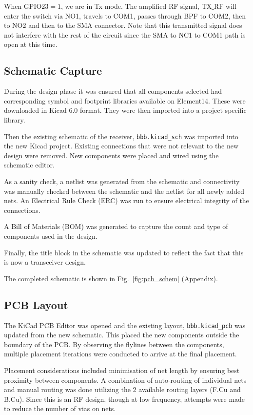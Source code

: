 \documentclass[conference]{IEEEtran}
\begin{document}
When $\text{GPIO23} = 1$, we are in Tx mode. The amplified RF signal, $\text{TX\_RF}$ will enter 
the switch via NO1, travels to COM1, passes through BPF to COM2, then to NO2 and then to the 
SMA connector. Note that this transmitted signal does not interfere with the rest of the circuit 
since the SMA to NC1 to COM1 path is open at this time.

\subsection{Schematic Capture}
During the design phase it was ensured that all components selected had corresponding 
symbol and footprint libraries available on Element14. These were downloaded in 
Kicad 6.0 format. They were then imported into a project specific library. 

Then the existing schematic of the receiver, \texttt{bbb.kicad\_sch} was imported into the new 
Kicad project. Existing connections that were not relevant to the new design were removed. 
New components were placed and wired using the schematic editor. 

As a sanity check, a netlist was generated from the schematic and connectivity was 
manually checked between the schematic and the netlist for all newly added nets. 
An Electrical Rule Check (ERC) was run to ensure electrical integrity of the connections.

A Bill of Materials (BOM) was generated to capture the count and type of components used
in the design. 

Finally, the title block in the schematic was updated to reflect the fact that this is 
now a transceiver design.

The completed schematic is shown in Fig.~\ref{fig:pcb_schem} (Appendix).

\subsection{PCB Layout}
The KiCad PCB Editor was opened and the existing layout, \texttt{bbb.kicad\_pcb} was
updated from the new schematic. This placed the new components outside the boundary
of the PCB. By observing the flylines between the components, multiple placement
iterations were conducted to arrive at the final placement.

Placement considerations included minimisation of net length by ensuring best proximity
between components. A combination of auto-routing of individual nets and manual
routing was done utilizing the 2 available routing layers (F.Cu and B.Cu).
Since this is an RF design, though at low frequency, attempts were made to reduce
the number of vias on nets.
\end{document}
